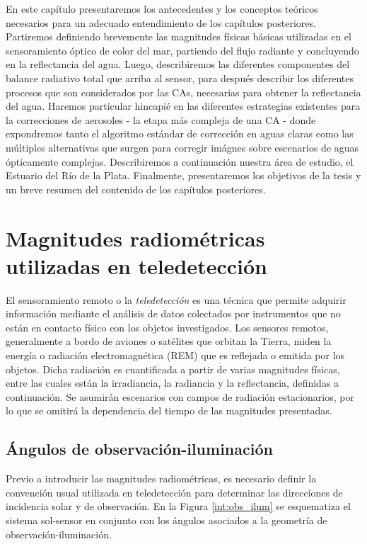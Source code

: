     En este capítulo presentaremos los antecedentes y los conceptos teóricos necesarios para un adecuado entendimiento de los capítulos posteriores. Partiremos definiendo brevemente las magnitudes físicas básicas utilizadas en el sensoramiento óptico de color del mar, partiendo del flujo radiante y concluyendo en la reflectancia del agua. Luego, describiremos las diferentes componentes del balance radiativo total que arriba al sensor, para después describir los diferentes procesos que son considerados por las CAs, necesarias para obtener la reflectancia del agua. Haremos particular hincapié en las diferentes estrategias existentes para la correcciones de aerosoles - la etapa más compleja de una CA - donde expondremos tanto el algoritmo estándar de corrección en aguas claras como las múltiples alternativas que surgen para corregir imágnes sobre escenarios de aguas ópticamente complejas. Describiremos a continuación nuestra área de estudio, el Estuario del Río de la Plata. Finalmente, presentaremos los objetivos de la tesis y un breve resumen del contenido de los capítulos posteriores.

\section{Magnitudes radiométricas utilizadas en teledetección}
\label{int:s:radiometricas}

    El sensoramiento remoto o la \textit{teledetección} es una técnica que permite adquirir información mediante el análisis de datos colectados por instrumentos que no están en contacto físico con los objetos investigados. Los sensores remotos, generalmente a bordo de aviones o satélites que orbitan la Tierra, miden la energía o radiación electromagnética (REM) que es reflejada o emitida por los objetos. Dicha radiación es cuantificada a partir de varias magnitudes físicas, entre las cuales están la irradiancia, la radiancia y la reflectancia, definidas a continuación. Se asumirán escenarios con campos de radiación estacionarios, por lo que se omitirá la dependencia del tiempo de las magnitudes presentadas.

	\subsection{Ángulos de observación-iluminación}
	\label{int:s:geometricas}
	
        Previo a introducir las magnitudes radiométricas, es necesario definir la convención usual utilizada en teledetección para determinar las direcciones de incidencia solar y de observación. En la Figura \ref{int:obs_ilum} se esquematiza el sistema sol-sensor en conjunto con los ángulos asociados a la geometría de observación-iluminación.
        
